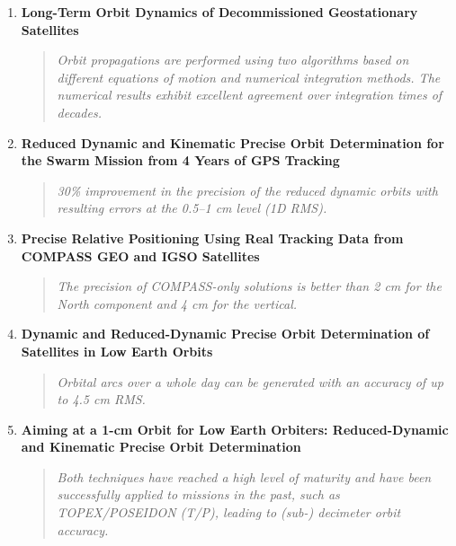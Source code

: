 \documentclass[a4paper,10pt]{article}
\begin{document}
\begin{enumerate}[label=\textbf{\arabic{enumi}.}, leftmargin=0.5in]
    \item \textbf{Long-Term Orbit Dynamics of Decommissioned Geostationary Satellites} \cite{proietti2021}
    \begin{quote}
        \textit{Orbit propagations are performed using two algorithms based on different equations of motion and numerical integration methods. The numerical results exhibit excellent agreement over integration times of decades.}
    \end{quote}
    
    \item \textbf{Reduced Dynamic and Kinematic Precise Orbit Determination for the Swarm Mission from 4 Years of GPS Tracking} \cite{montenbruck2018reduced}
    \begin{quote}
        \textit{30\% improvement in the precision of the reduced dynamic orbits with resulting errors at the 0.5--1 cm level (1D RMS).}
    \end{quote}

    \item \textbf{Precise Relative Positioning Using Real Tracking Data from COMPASS GEO and IGSO Satellites} \cite{shi2013precise}
    \begin{quote}
        \textit{The precision of COMPASS-only solutions is better than 2 cm for the North component and 4 cm for the vertical.}
    \end{quote}

    \item \textbf{Dynamic and Reduced-Dynamic Precise Orbit Determination of Satellites in Low Earth Orbits} \cite{swatschina2012dynamic}
    \begin{quote}
        \textit{Orbital arcs over a whole day can be generated with an accuracy of up to 4.5 cm RMS.}
    \end{quote}
    
    \item \textbf{Aiming at a 1-cm Orbit for Low Earth Orbiters: Reduced-Dynamic and Kinematic Precise Orbit Determination} \cite{visser2003aiming}
    \begin{quote}
        \textit{Both techniques have reached a high level of maturity and have been successfully applied to missions in the past, such as TOPEX/POSEIDON (T/P), leading to (sub-) decimeter orbit accuracy.}
    \end{quote}

\end{enumerate}
\end{document}
